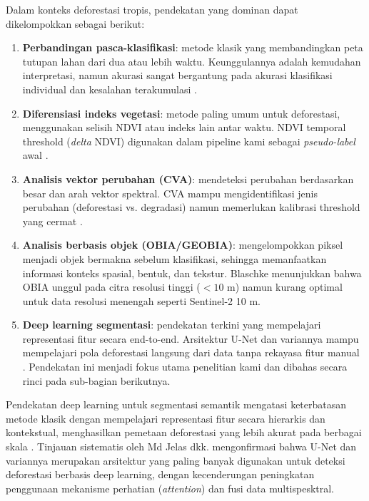 \documentclass[12pt,a4paper]{article}
\begin{document}
Dalam konteks deforestasi tropis, pendekatan yang dominan dapat
dikelompokkan sebagai berikut:

\begin{enumerate}[nosep]
    \item \textbf{Perbandingan pasca-klasifikasi}: metode klasik
          yang membandingkan peta tutupan lahan dari dua atau lebih
          waktu. Keunggulannya adalah kemudahan interpretasi, namun
          akurasi sangat bergantung pada akurasi klasifikasi
          individual dan kesalahan terakumulasi \cite{lu2004change}.
    \item \textbf{Diferensiasi indeks vegetasi}: metode paling umum
          untuk deforestasi, menggunakan selisih NDVI atau indeks
          lain antar waktu. NDVI temporal threshold (\textit{delta}
          NDVI) digunakan dalam pipeline kami sebagai \textit{pseudo-label}
          awal \cite{blaschke2010obia}.
    \item \textbf{Analisis vektor perubahan (CVA)}: mendeteksi
          perubahan berdasarkan besar dan arah vektor spektral.
          CVA mampu mengidentifikasi jenis perubahan (deforestasi
          vs. degradasi) namun memerlukan kalibrasi threshold yang
          cermat \cite{lu2004change}.
    \item \textbf{Analisis berbasis objek (OBIA/GEOBIA)}:
          mengelompokkan piksel menjadi objek bermakna sebelum
          klasifikasi, sehingga memanfaatkan informasi konteks
          spasial, bentuk, dan tekstur. Blaschke \cite{blaschke2010obia}
          menunjukkan bahwa OBIA unggul pada citra resolusi tinggi
          ($<10$ m) namun kurang optimal untuk data resolusi
          menengah seperti Sentinel-2 10 m.
    \item \textbf{Deep learning segmentasi}: pendekatan terkini
          yang mempelajari representasi fitur secara end-to-end.
          Arsitektur U-Net dan variannya mampu mempelajari pola
          deforestasi langsung dari data tanpa rekayasa fitur
          manual \cite{ronneberger2015unet, john2022attention}.
          Pendekatan ini menjadi fokus utama penelitian kami dan
          dibahas secara rinci pada sub-bagian berikutnya.
\end{enumerate}

Pendekatan deep learning untuk segmentasi semantik mengatasi
keterbatasan metode klasik dengan mempelajari representasi fitur
secara hierarkis dan kontekstual, menghasilkan pemetaan deforestasi
yang lebih akurat pada berbagai skala \cite{zhu2017deep,
ma2019deep}. Tinjauan sistematis oleh Md Jelas dkk.
\cite{mdjelas2024deforestation} mengonfirmasi bahwa U-Net dan
variannya merupakan arsitektur yang paling banyak digunakan untuk
deteksi deforestasi berbasis deep learning, dengan kecenderungan
peningkatan penggunaan mekanisme perhatian (\textit{attention})
dan fusi data multispesktral.
\end{document}
